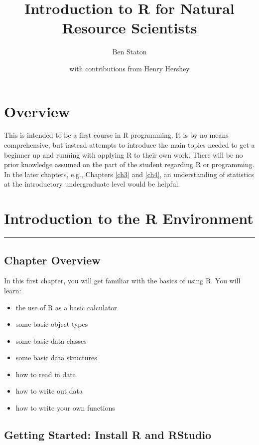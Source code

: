 \documentclass[]{book}
\title{Introduction to R for Natural Resource Scientists}
\author{Ben Staton}
\date{with contributions from Henry Hershey}
\providecommand{\tightlist}{%
  \setlength{\itemsep}{0pt}\setlength{\parskip}{0pt}}
\theoremstyle{definition}
\theoremstyle{definition}
\theoremstyle{definition}
\theoremstyle{remark}
\begin{document}
\maketitle

{
\setcounter{tocdepth}{1}
\tableofcontents
}
\chapter*{Overview}\label{overview}

This is intended to be a first course in R programming. It is by no
means comprehensive, but instead attempts to introduce the main topics
needed to get a beginner up and running with applying R to their own
work. There will be no prior knowledge assumed on the part of the
student regarding R or programming. In the later chapters, e.g.,
Chapters \ref{ch3} and \ref{ch4}, an understanding of statistics at the
introductory undergraduate level would be helpful.

\chapter{Introduction to the R Environment}\label{ch1}

\begin{center}\rule{0.5\linewidth}{\linethickness}\end{center}

\section*{Chapter Overview}\label{chapter-overview}

In this first chapter, you will get familiar with the basics of using R.
You will learn:

\begin{itemize}
\tightlist
\item
  the use of R as a basic calculator
\item
  some basic object types
\item
  some basic data classes
\item
  some basic data structures
\item
  how to read in data
\item
  how to write out data
\item
  how to write your own functions
\end{itemize}

\section{Getting Started: Install R and
RStudio}\label{getting-started-install-r-and-rstudio}
\end{document}
